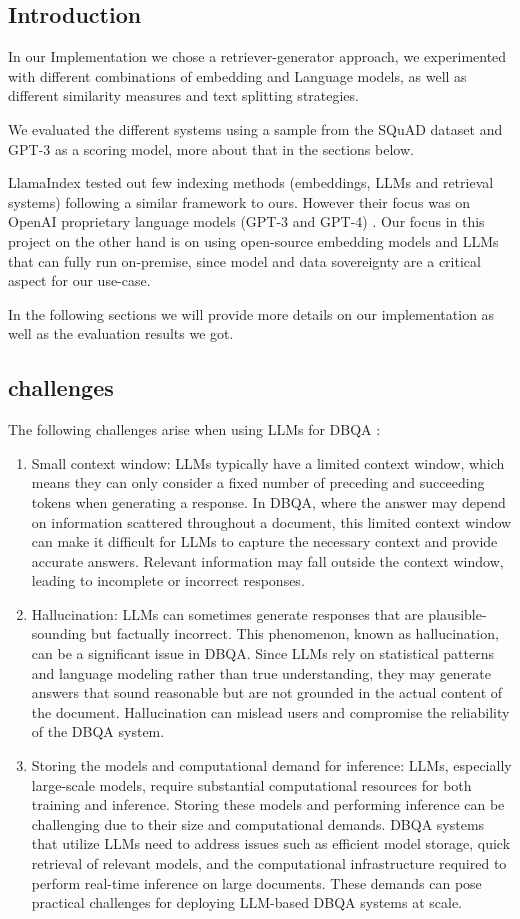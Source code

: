 \documentclass[a4paper,12pt]{article}
\begin{document}
\subsection{Introduction}
In our Implementation we chose a retriever-generator approach, we experimented with different combinations of embedding and Language models, as well as different similarity measures and text splitting strategies.

We evaluated the different systems using a sample from the SQuAD \cite{squad} dataset and GPT-3 \cite{gpt3} as a scoring model, more about that in the sections below.  

LlamaIndex \cite{llamaindex} tested out few indexing methods (embeddings, LLMs and retrieval systems) following a similar framework to ours. 
However their focus was on OpenAI proprietary language models (GPT-3 and GPT-4) \cite{gpt3, gpt4}. Our focus in this project 
on the other hand is on using open-source embedding models and LLMs that can fully run on-premise, since model and data sovereignty are a critical aspect for our use-case.

In the following sections we will provide more details on our implementation as well as the evaluation results we got.

\subsection{challenges}
The following challenges arise when using LLMs for DBQA : 
\begin{enumerate}
  \item Small context window: LLMs typically have a limited context window, which means they can only consider a fixed number of preceding and succeeding tokens when generating a response. In DBQA, where the answer may depend on information scattered throughout a document, this limited context window can make it difficult for LLMs to capture the necessary context and provide accurate answers. Relevant information may fall outside the context window, leading to incomplete or incorrect responses.
  \item Hallucination: LLMs can sometimes generate responses that are plausible-sounding but factually incorrect. This phenomenon, known as hallucination, can be a significant issue in DBQA. Since LLMs rely on statistical patterns and language modeling rather than true understanding, they may generate answers that sound reasonable but are not grounded in the actual content of the document. Hallucination can mislead users and compromise the reliability of the DBQA system.
  \item Storing the models and computational demand for inference: LLMs, especially large-scale models, require substantial computational resources for both training and inference. Storing these models and performing inference can be challenging due to their size and computational demands. DBQA systems that utilize LLMs need to address issues such as efficient model storage, quick retrieval of relevant models, and the computational infrastructure required to perform real-time inference on large documents. These demands can pose practical challenges for deploying LLM-based DBQA systems at scale.
\end{enumerate}
\end{document}
